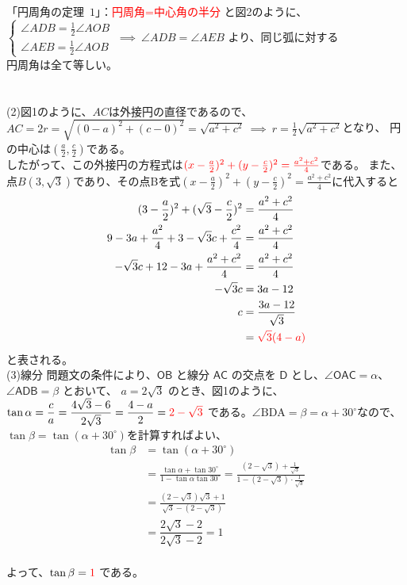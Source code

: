 \documentclass[dvipdfmx,a4paper,12pt]{jarticle}
\theoremstyle{mystyle}
\begin{document}
\noindent
「円周角の定理\ $1$」：\textcolor{red}{円周角=中心角の半分} と図2のように、\\[0.5em]
$\begin{cases}\angle ADB = \frac{1}{2}\angle AOB \\ \angle AEB = \frac{1}{2}\angle AOB\end{cases}\ \implies\ \angle ADB = \angle AEB$ 
より、同じ弧に対する\\[0.5em]
円周角は全て等しい。\\
\\
\\

\noindent
(2)\quad 図1のように、$AC$は外接円の直径であるので、$AC=2r=\sqrt{(0-a)^2+(c-0)^2}=\sqrt{a^2+c^2}\ \implies\ r=\frac{1}{2}\sqrt{a^2+c^2}$となり、
円の中心は$\left(\frac{a}{2},\frac{c}{2}\right)$である。\\
したがって、この外接円の方程式は$\color{red}(x-\frac{a}{2})^2+(y-\frac{c}{2})^2=\frac{a^2+c^2}{4}$である。
また、点$B(3,\sqrt{3})$であり、その点Bを式$(x-\frac{a}{2})^2+(y-\frac{c}{2})^2=\frac{a^2+c^2}{4}$に代入すると
\begin{align*}
(3-\frac{a}{2})^2+(\sqrt{3}-\frac{c}{2})^2 &=\frac{a^2+c^2}{4}\\
9-3a+\frac{a^2}{4}+3-\sqrt{3}c+\dfrac{c^2}{4}&=\frac{a^2+c^2}{4}\\
-\sqrt{3}c+12-3a+\dfrac{a^2+c^2}{4}&=\frac{a^2+c^2}{4}\\
-\sqrt{3}c &= 3a-12\\
c &= \frac{3a-12}{\sqrt{3}}\\
&= {\color{red}{\sqrt{3}(4-a)}}
\end{align*}
と表される。\\
\newpage
\noindent
(3)\quad 線分 問題文の条件により、$\mathsf{OB}$ と線分 $\mathsf{AC}$ の交点を $\mathsf{D}$ とし、$\angle \mathsf{OAC} = \alpha$、\\[0.5em]
$\angle \mathsf{ADB} = \beta$ とおいて、
$a = 2\sqrt{3}$ のとき、図1のように、$\tan \alpha =\dfrac{c}{a}=\dfrac{4\sqrt{3}-6}{2\sqrt{3}}=\dfrac{4-a}{2}=\color{red}2-\sqrt{3}$ である。$\angle \mathrm{BDA}=\beta=\alpha + 30^\circ$なので、\\[0.5em]
$\tan \beta=\tan (\alpha + 30^\circ)$を計算すればよい、
\begin{align*}
\tan \beta &=\tan (\alpha + 30^\circ)\\
&= \frac{\tan \alpha + \tan 30^\circ}{1 - \tan \alpha \tan 30^\circ} = \frac{(2-\sqrt{3})+\frac{1}{\sqrt{3}}}{1-(2-\sqrt{3})\cdot\frac{1}{\sqrt{3}}}\\
&= \frac{(2-\sqrt{3})\sqrt{3}+1}{\sqrt{3}-(2-\sqrt{3})} \\
&= \dfrac{2\sqrt{3}-2}{2\sqrt{3}-2} = 1
\end{align*}
\\
よって、$\tan \beta = \color{red}1$ である。\\
\end{document}
